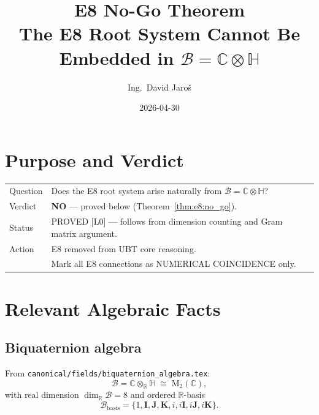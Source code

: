 \documentclass[12pt,a4paper]{article}
\title{\textbf{E8 No-Go Theorem}\\
         \large The E8 Root System Cannot Be Embedded in $\mathcal{B} = \mathbb{C}\otimes\mathbb{H}$}
\author{Ing.\ David Jaro\v{s}}
\date{2026-04-30}
\theoremstyle{definition}
\theoremstyle{remark}
\begin{document}
  \maketitle
\fi

\section{Purpose and Verdict}
\label{sec:e8:purpose}

\begin{tcolorbox}[colback=red!6!white, colframe=red!60!black,
                  title=\textbf{E8 Route: DISPROVED}]
\begin{tabular}{ll}
Question & Does the E8 root system arise naturally from $\mathcal{B}=\mathbb{C}\otimes\mathbb{H}$? \\
Verdict  & \textbf{NO} — proved below (Theorem~\ref{thm:e8:no_go}). \\
Status   & PROVED [L0] — follows from dimension counting and Gram matrix argument. \\
Action   & E8 removed from UBT core reasoning. \\
         & Mark all E8 connections as NUMERICAL COINCIDENCE only. \\
\end{tabular}
\end{tcolorbox}

\section{Relevant Algebraic Facts}
\label{sec:e8:facts}

\subsection{Biquaternion algebra}

From \texttt{canonical/fields/biquaternion\_algebra.tex}:
\begin{equation}
  \mathcal{B} = \mathbb{C}\otimes_{\mathbb{R}}\mathbb{H}
  \;\cong\; \mathrm{M}_2(\mathbb{C}),
  \label{eq:e8:B}
\end{equation}
with real dimension $\dim_{\mathbb{R}}\mathcal{B} = 8$ and ordered $\mathbb{R}$-basis
\begin{equation}
  \mathcal{B}_{\mathrm{basis}}
  = \{1, \mathbf{I}, \mathbf{J}, \mathbf{K}, i, i\mathbf{I}, i\mathbf{J}, i\mathbf{K}\}.
  \label{eq:e8:basis}
\end{equation}
\end{document}
